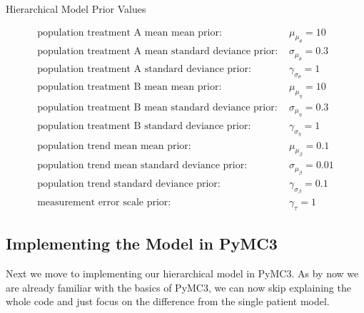 \documentclass[12pt,a4paper,leqno]{report}
\theoremstyle{plain}
\theoremstyle{definition}
\theoremstyle{remark}
\begin{document}
\begin{table}[H]
    \caption{Hierarchical Model Prior Values}\label{hierarchicalmodelpriorvalues}
    \begin{align}\label{}
        \text{population treatment A mean mean prior: } & \mu_{\mu_{\theta}} = 10 \nonumber \\
        \text{population treatment A mean standard deviance prior: } & \sigma_{\mu_{\theta}} = 0.3 \nonumber \\
        \text{population treatment A standard deviance prior: } & \gamma_{\sigma_{\theta}} = 1 \nonumber \\
        \text{population treatment B mean mean prior: } & \mu_{\mu_{\eta}} = 10 \nonumber \\
        \text{population treatment B mean standard deviance prior: } & \sigma_{\mu_{\eta}} = 0.3 \nonumber \\
        \text{population treatment B standard deviance prior: } & \gamma_{\sigma_{\eta}} = 1 \nonumber \\
        \text{population trend mean mean prior: } & \mu_{\mu_{\beta}} = 0.1 \nonumber \\
        \text{population trend mean standard deviance prior: } & \sigma_{\mu_{\beta}} = 0.01 \nonumber \\
        \text{population trend standard deviance prior: } & \gamma_{\sigma_{\beta}} = 0.1 \nonumber \\
        \text{measurement error scale prior: } & \gamma_{\tau} = 1 \nonumber
    \end{align}
\end{table}

\subsection{Implementing the Model in PyMC3}

Next we move to implementing our hierarchical model in PyMC3. As by now we are already
familiar with the basics of PyMC3, we can now skip explaining the whole code and just focus
on the difference from the single patient model.
\end{document}
